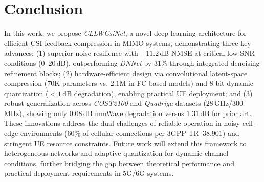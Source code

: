 \documentclass[lettersize,journal]{IEEEtran}
\begin{document}
\section{Conclusion}
In this work, we propose \textit{CLLWCsiNet}, a novel deep learning architecture for efficient CSI feedback compression in MIMO systems, demonstrating three key advances: (1) superior noise resilience with $-11.2$\,dB NMSE at critical low-SNR conditions ($0$--$20$\,dB), outperforming \textit{DNNet} by $31\%$ through integrated denoising refinement blocks; (2) hardware-efficient design via convolutional latent-space compression ($70$K parameters vs. $2.1$M in FC-based models) and $8$-bit dynamic quantization ($<1$\,dB degradation), enabling practical UE deployment; and (3) robust generalization across \textit{COST2100} and \textit{Quadriga} datasets ($28$\,GHz/$300$\,MHz), showing only $0.08$\,dB mmWave degradation versus $1.31$\,dB for prior art. These innovations address the dual challenges of reliable operation in noisy cell-edge environments ($60\%$ of cellular connections per 3GPP TR~38.901) and stringent UE resource constraints. Future work will extend this framework to heterogeneous networks and adaptive quantization for dynamic channel conditions, further bridging the gap between theoretical performance and practical deployment requirements in 5G/6G systems.
\end{document}
